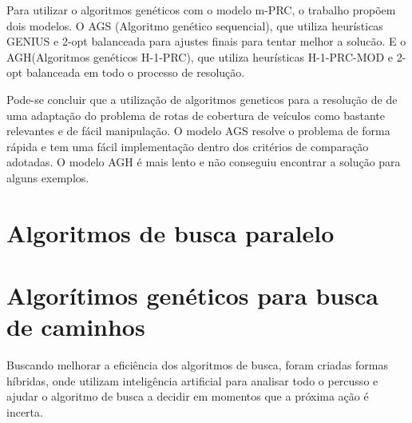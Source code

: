 \begin{minipage}{\linewidth}
\end{minipage}

Para utilizar o algoritmos genéticos com o modelo m-PRC, o trabalho propõem dois modelos. O AGS (Algoritmo genético sequencial), que utiliza heurísticas GENIUS e 2-opt balanceada para ajustes finais para tentar melhor a solucão. E o AGH(Algoritmos genéticos H-1-PRC), que utiliza heurísticas H-1-PRC-MOD e 2-opt balanceada em todo o processo de resolução.

Pode-se concluir que a utilização de algoritmos geneticos para a resolução de de uma adaptação do problema de rotas de cobertura de veículos como bastante relevantes e de fácil manipulação. O modelo AGS resolve o problema de forma rápida e tem uma fácil implementação dentro dos critérios de comparação adotadas. O modelo AGH é mais lento e não conseguiu encontrar a solução para alguns exemplos.

\section{Algoritmos de busca paralelo}

\section{Algorítimos genéticos para busca de caminhos}

Buscando melhorar a eficiência dos algoritmos de busca, foram criadas formas híbridas, onde utilizam inteligência artificial para analisar todo o percusso e ajudar o algoritmo de busca a decidir em momentos que a próxima ação é incerta.

